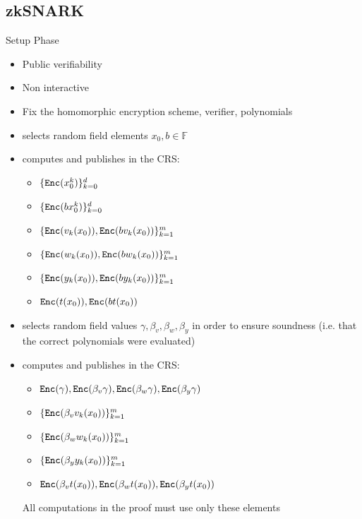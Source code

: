 \documentclass[handout]{beamer}
\begin{document}
\subsection{zkSNARK}
\begin{frame}[allowframebreaks]{Setup Phase} 
    \begin{itemize}
        \item Public verifiability
        \item Non interactive
        \item Fix the homomorphic encryption scheme, verifier, polynomials 
        \item \ver selects random field elements $x_0,b \in \mathbb{F}$
        \item computes and publishes in the CRS:
        \begin{itemize}
            \item $\{ \mathtt{Enc}(x_0^k) \}_{k=0}^d$
            \item $\{ \mathtt{Enc}(bx_0^k)\}_{k=0}^d$
            \item $\{ \mathtt{Enc}(v_k(x_0)),\mathtt{Enc}(bv_k(x_0)) \}_{k=1}^m$
            \item $\{ \mathtt{Enc}(w_k(x_0)),\mathtt{Enc}(bw_k(x_0)) \}_{k=1}^m$
            \item $\{ \mathtt{Enc}(y_k(x_0)),\mathtt{Enc}(by_k(x_0)) \}_{k=1}^m$
            \item $\mathtt{Enc}(t(x_0)), \mathtt{Enc}(bt(x_0))$
        \end{itemize} 

        \framebreak

        \item selects random field values $\gamma, \beta_v, \beta_w, \beta_y$ in order to ensure soundness (i.e. that the correct polynomials were evaluated)
        \item computes and publishes in the CRS:
        \begin{itemize}
            \item $\mathtt{Enc}(\gamma), \mathtt{Enc}(\beta_v \gamma), \mathtt{Enc}(\beta_w \gamma), \mathtt{Enc}(\beta_y \gamma)$
            \item $\{ \mathtt{Enc}( \beta_v v_k(x_0))\}_{k=1}^m$
            \item $\{ \mathtt{Enc}(\beta_w w_k(x_0))\}_{k=1}^m$
            \item $\{ \mathtt{Enc}(\beta_y y_k(x_0))\}_{k=1}^m$
            \item $\mathtt{Enc}(\beta_v t(x_0)), \mathtt{Enc}(\beta_w t(x_0)), \mathtt{Enc}(\beta_y t(x_0))$
        \end{itemize} 

        All computations in the proof must use only these elements
    \end{itemize}
\end{frame}
\end{document}
